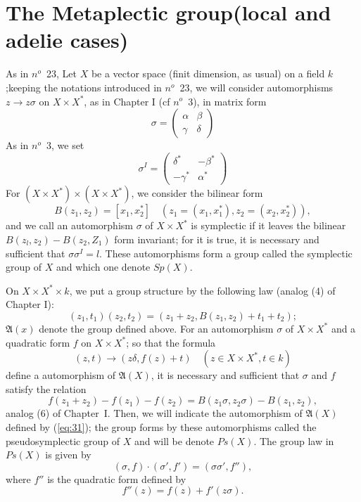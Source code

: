 \documentclass[12pt]{amsart}
\newcounter{ssection}
\renewcommand{\subsection}{
  \addtocounter{ssection}{1}{\bf  \arabic{ssection}.\  }}
\begin{document}
\section{The Metaplectic group(local and adelie cases)}
\setcounter{ssection}{30}
\subsection{}
 As in $n^o$~23, Let $X$ be a vector space (finit dimension, as usual) 
on a field $k$;keeping the notations introduced in $n^o$~23, we 
will consider automorphisms $z\to z\sigma$ on $X\times  X^*$,
as in Chapter I (cf $n^o$~3), in matrix form
\[
\sigma = \begin{pmatrix} \alpha & \beta\\ \gamma & \delta
\end{pmatrix}
\]
As in $n^o$~3, we set 
\[
\sigma^I = \begin{pmatrix} \delta^* & -\beta^* \\ -\gamma^* & \alpha^*
\end{pmatrix}
\]
For $(X\times X^*)\times (X\times X^*)$, we consider the bilinear form
\[
B(z_1,z_2) = [x_1,x_2^*] \quad (z_1 = (x_1,x_1^*), z_2=(x_2,x_2^*)),
\]
and we call an automorphism $\sigma$ of $X\times X^*$ is symplectic 
if it leaves the bilinear $B(z_l,z_2) - B(z_2,Z_1)$ form invariant; 
for it is true, it is necessary and sufficient that $\sigma \sigma^I=l$. 
These automorphisms form a group called the symplectic group of $X$ 
and which one denote $Sp(X)$.

On $X\times X^* \times k$, we put a group structure by the following law 
(analog (4) of Chapter I):
\begin{equation}\label{eq:30}
(z_1,t_1)(z_2,t_2)=(z_1+z_2,B(z_1,z_2)+t_1+t_2);
\end{equation}
\def\fA{{\mathfrak{A}}}
$\fA(x)$ denote the group defined above.
For an automorphism $\sigma$ of $X \times X^*$ and a quadratic form $f$ 
on $X \times X^*$; so that the formula
\begin{equation}\label{eq:31}
(z,t) \to (z\delta, f(z)+t) \quad (z\in X\times X^*, t\in k)
\end{equation}
define a automorphism of $\fA(X)$, it is necessary and sufficient that $\sigma$ and $f$ 
satisfy the relation
\begin{equation}\label{eq:32}
f(z_1+z_2)-f(z_1)-f(z_2) = B(z_1\sigma, z_2\sigma)-B(z_1,z_2),
\end{equation}
analog (6) of Chapter~I.
Then, we will indicate the automorphism 
of $\fA(X)$ defined by (\ref{eq:31});   
the group forms by these automorphisms called the  
pseudosymplectic group of $X$ and will be denote $Ps(X)$.  
The group law in $Ps(X)$ is given by 
\[
(\sigma,f)\cdot (\sigma',f') = (\sigma\sigma',f''), 
\]
where $f''$ is the quadratic form defined by 
\[
f''(z) =f(z)+f'(z\sigma).
\]
\end{document}
